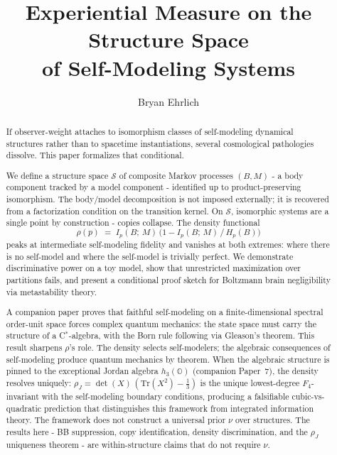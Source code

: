 \documentclass[12pt]{article}
\title{Experiential Measure on the Structure Space\\of Self-Modeling Systems}
\author{Bryan Ehrlich}
\date{}
\theoremstyle{remark}
\begin{document}
\maketitle


\begin{abstract}
If observer-weight attaches to isomorphism classes of self-modeling dynamical structures rather than to spacetime instantiations, several cosmological pathologies dissolve. This paper formalizes that conditional.

We define a structure space $\mathcal{S}$ of composite Markov processes $(B, M)$ - a body component tracked by a model component - identified up to product-preserving isomorphism. The body/model decomposition is not imposed externally; it is recovered from a factorization condition on the transition kernel. On $\mathcal{S}$, isomorphic systems are a single point by construction - copies collapse. The density functional
\[
  \rho(p) \;=\; I_p(B;\,M)\,\bigl(1 - I_p(B;\,M)\,/\,H_p(B)\bigr)
\]
peaks at intermediate self-modeling fidelity and vanishes at both extremes: where there is no self-model and where the self-model is trivially perfect. We demonstrate discriminative power on a toy model, show that unrestricted maximization over partitions fails, and present a conditional proof sketch for Boltzmann brain negligibility via metastability theory.

A companion paper \cite{ehrlich2026qm} proves that faithful self-modeling on a finite-dimensional spectral order-unit space forces complex quantum mechanics: the state space must carry the structure of a C$^*$-algebra, with the Born rule following via Gleason's theorem. This result sharpens $\rho$'s role. The density selects self-modelers; the algebraic consequences of self-modeling produce quantum mechanics by theorem. When the algebraic structure is pinned to the exceptional Jordan algebra $h_3(\mathbb{O})$ (companion Paper~7), the density resolves uniquely: $\rho_J = \det(X)\,(\mathrm{Tr}(X^2) - \tfrac{1}{3})$ is the unique lowest-degree $F_4$-invariant with the self-modeling boundary conditions, producing a falsifiable cubic-vs-quadratic prediction that distinguishes this framework from integrated information theory. The framework does not construct a universal prior $\nu$ over structures. The results here - BB suppression, copy identification, density discrimination, and the $\rho_J$ uniqueness theorem - are within-structure claims that do not require $\nu$.
\end{abstract}
\end{document}
